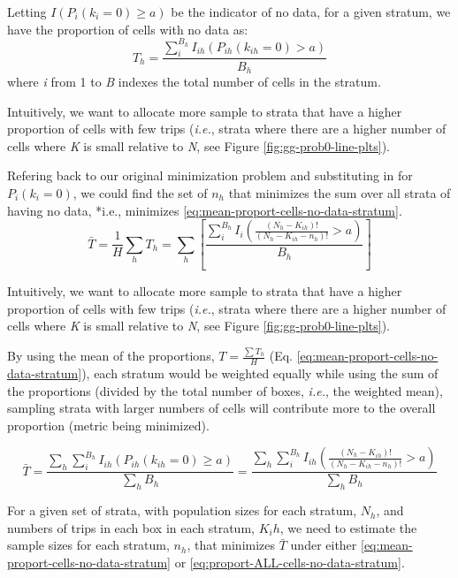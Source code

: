 \documentclass[
]{article}
\begin{document}
Letting \(I\left(P_i\left(k_i = 0\right) \geq a\right)\) be the indicator of no data, for a given
stratum, we have the proportion of cells with no data as:
\begin{equation}
  T_h = \frac{\sum_{i}^{B_h} I_{ih}\left(P_{ih}(k_{ih} = 0) > a\right)}{B_h} 
  \label{eq:proport-cells-no-data-stratum} 
\end{equation}
where \emph{i} from 1 to \emph{B} indexes the total number of cells in the stratum.

Intuitively, we want to allocate more sample to strata that have a higher
proportion of cells with few trips (\emph{i.e.}, strata where there are a higher
number of cells where \emph{K} is small relative to \emph{N}, see Figure
\ref{fig:gg-prob0-line-plts}).

Refering back to our original minimization problem and substituting in
for\(P_i(k_i = 0)\), we could find the set of \(n_h\) that minimizes the sum
over all strata of having no data, *i.e., minimizes
\eqref{eq:mean-proport-cells-no-data-stratum}.
\begin{equation}
  \bar{T} = \frac{1}{H} \sum_{h}T_h = \sum_{h}
\left[\frac{\sum_{i}^{B_h} I_i\left(\frac{(N_{h} - K_{ih})!}{(N_{h} - K_{ih} - n_{h})!} > a\right)}{B_h}\right]
  \label{eq:mean-proport-cells-no-data-stratum} 
\end{equation}

Intuitively, we want to allocate more sample to strata that have a higher
proportion of cells with few trips (\emph{i.e.}, strata where there are a higher
number of cells where \emph{K} is small relative to \emph{N}, see Figure
\ref{fig:gg-prob0-line-plts}).

By using the mean of the proportions, \(T = \frac{\sum{T_h}}{H}\) (Eq.
\eqref{eq:mean-proport-cells-no-data-stratum}), each stratum would be weighted
equally while using the sum of the proportions (divided by the total number of
boxes, \emph{i.e.}, the weighted mean), sampling strata with larger numbers of cells
will contribute more to the overall proportion (metric being minimized).

\begin{equation}
  \bar{T} = \frac{\sum_{h}\sum_{i}^{B_h} I_{ih}\left(P_{ih}(k_{ih} = 0)
\geq a\right)}{\sum_{h}{B_h}} = \frac{\sum_{h}\sum_{i}^{B_h}
I_{ih}\left(\frac{(N_{h} - K_{ih})!}{(N_{h} - K_{ih} - n_{h})!} >
a\right)}{\sum_{h}B_h} 
  \label{eq:proport-ALL-cells-no-data-stratum} 
\end{equation}

For a given set of strata, with population sizes for each stratum, \(N_h\), and
numbers of trips in each box in each stratum, \(K_ih\), we need to estimate the
sample sizes for each stratum, \(n_h\), that minimizes \(\bar{T}\) under either
\eqref{eq:mean-proport-cells-no-data-stratum} or
\eqref{eq:proport-ALL-cells-no-data-stratum}.
\end{document}
